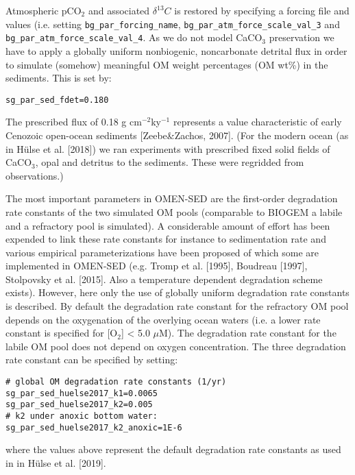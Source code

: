 \documentclass[11pt,fleqn]{book} %
\begin{document}
Atmospheric pCO$_2$ and associated \(\delta^{13}C\) is restored by specifying a forcing file and values (i.e. setting  \texttt{bg\_par\_forcing\_name}, \texttt{bg\_par\_atm\_force\_scale\_val\_3} and \texttt{bg\_par\_atm\_force\_scale\_val\_4}.
As we do not model CaCO$_3$ preservation we have to apply a globally uniform nonbiogenic, noncarbonate detrital flux in order to simulate (somehow) meaningful OM weight percentages (OM wt\%) in the sediments. This is set by:
\vspace{-1mm}\begin{verbatim}
sg_par_sed_fdet=0.180
\end{verbatim}\vspace{-1mm}
The prescribed flux of 0.18 g cm$^{-2}$ky$^{-1}$ represents a value characteristic of early Cenozoic open-ocean sediments [Zeebe\&Zachos, 2007]. (For the modern ocean (as in H\"ulse et al. [2018]) we ran experiments with prescribed fixed solid
fields of CaCO$_3$, opal and detritus to the sediments. These were regridded from observations.)

The most important parameters in OMEN-SED are the first-order degradation rate constants of the two simulated OM pools (comparable to BIOGEM a labile and a refractory pool is simulated). A considerable amount of effort has been expended to link these rate
constants for instance to sedimentation rate and various empirical parameterizations have been proposed of which some are implemented in OMEN-SED (e.g. Tromp et al. [1995], Boudreau [1997], Stolpovsky et al. [2015]. Also a temperature dependent
degradation scheme exists). However, here only the use of globally uniform degradation rate constants is described. By default the degradation rate constant for the refractory OM pool depends on the oxygenation of the overlying ocean waters
(i.e. a lower rate constant is specified for [O$_2$] < 5.0 $\mu$M). The degradation rate constant for the labile OM pool does not depend on oxygen concentration. The three degradation rate constant can be specified by setting:
\vspace{-1mm}\begin{verbatim}
# global OM degradation rate constants (1/yr)
sg_par_sed_huelse2017_k1=0.0065
sg_par_sed_huelse2017_k2=0.005
# k2 under anoxic bottom water:
sg_par_sed_huelse2017_k2_anoxic=1E-6
\end{verbatim}\vspace{-1mm}
where the values above represent the default degradation rate constants as used in in H\"ulse et al. [2019].
\end{document}

